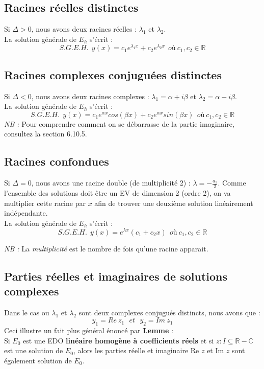 \documentclass[11pt, a4paper, openany]{book}
\begin{document}
\subsection{Racines réelles distinctes}
Si $\Delta > 0$, nous avons deux racines réelles : $\lambda_1$ et $\lambda_2$.\\La solution générale de $E_h$ s'écrit :
$$S.G.E.H.\ \ y(x) = c_1e^{\lambda_1 x} + c_2e^{\lambda_2 x}\ \ où\ c_1, c_2 \in \mathbb{R}$$

\subsection{Racines complexes conjuguées distinctes}
Si $\Delta < 0$, nous avons deux racines complexes : $\lambda_1 = \alpha +i\beta$ et $\lambda_2 = \alpha -i\beta$.\\
La solution générale de $E_h$ s'écrit :
$$S.G.E.H.\ \ y(x) = c_1e^{\alpha x} cos(\beta x) +c_2e^{\alpha x} sin(\beta x)\ \ où\ c_1, c_2 \in \mathbb{R}$$
\textit{NB :} Pour comprendre comment on se débarrasse de la partie imaginaire, consultez la section 6.10.5.

\subsection{Racines confondues}
Si $\Delta = 0$, nous avons une racine double (de multiplicité 2) : $\lambda = -\frac{a_1}{2}$. Comme l'ensemble des solutions doit être un EV de dimension 2 (ordre 2), on va multiplier cette racine par $x$ afin de trouver une deuxième solution linéairement indépendante.\\
La solution générale de $E_h$ s'écrit :
$$S.G.E.H.\ \ y(x) = e^{\lambda x}(c_1 + c_2x)\ \ où\ c_1, c_2 \in \mathbb{R}$$ 

\textit{NB :} La \textit{multiplicité} est le nombre de fois qu'une racine apparait. 

\subsection{Parties réelles et imaginaires de solutions complexes}
Dans le cas ou $\lambda_1$ et $\lambda_2$ sont deux complexes conjugués distincts, nous avons que :
$$y_1 = Re\ z_1\ \ \ et\ \  \ y_2 = Im\ z_1$$
Ceci illustre un fait plus général énoncé par \textbf{Lemme} :\\
Si $E_0$ est une EDO \textbf{linéaire homogène à coefficients réels} et si $z : I \subseteq \mathbb{R} - \mathbb{C}$ est une solution de $E_0$, alors les parties réelle et imaginaire Re $z$ et Im $z$ sont également solution de $E_0$.
\end{document}
